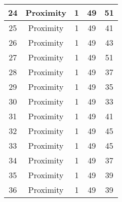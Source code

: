\documentclass[results.tex]{subfiles}
\begin{document}
\begin{center}
\begin{tabular}{| c || c | c | c | c |}
            \hline
            24                      & Proximity                    & 1                      & 49                      & 51                   \\
            \hline
            25                      & Proximity                    & 1                      & 49                      & 41                   \\
            \hline
            26                      & Proximity                    & 1                      & 49                      & 43                   \\
            \hline
            27                      & Proximity                    & 1                      & 49                      & 51                   \\
            \hline
            28                      & Proximity                    & 1                      & 49                      & 37                   \\
            \hline
            29                      & Proximity                    & 1                      & 49                      & 35                   \\
            \hline
            30                      & Proximity                    & 1                      & 49                      & 33                   \\
            \hline
            31                      & Proximity                    & 1                      & 49                      & 41                   \\
            \hline
            32                      & Proximity                    & 1                      & 49                      & 45                   \\
            \hline
            33                      & Proximity                    & 1                      & 49                      & 45                   \\
            \hline
            34                      & Proximity                    & 1                      & 49                      & 37                   \\
            \hline
            35                      & Proximity                    & 1                      & 49                      & 39                   \\
            \hline
            36                      & Proximity                    & 1                      & 49                      & 39                   \\

\end{tabular}
\end{center}
\end{document}
